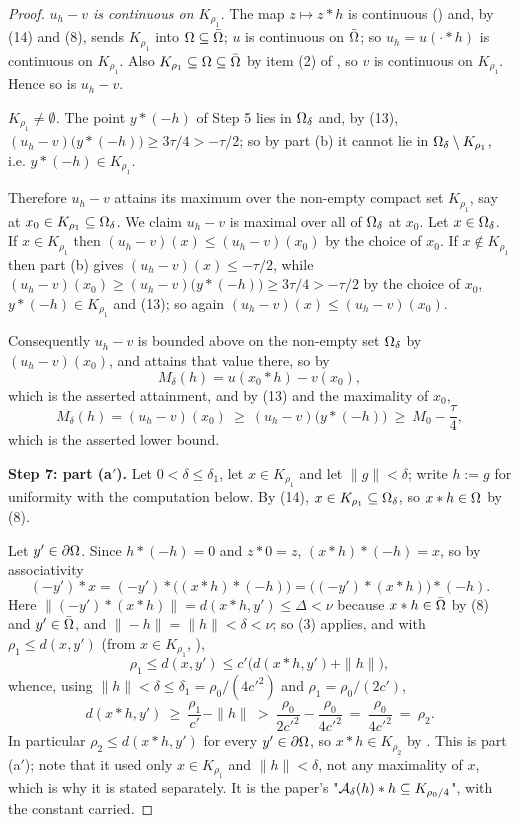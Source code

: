 \begin{proof}
\emph{$u_h-v$ is continuous on $K_{\rho_1}$.} The map $z\mapsto z*h$ is continuous
() and, by (14) and (8), sends $K_{\rho_1}$ into $\Omega\subseteq\bar{\Omega}$;
$u$ is continuous on $\bar{\Omega}$; so $u_h=u(\cdot*h)$ is continuous on $K_{\rho_1}$. Also
$K_{\rho_1}\subseteq\Omega\subseteq\bar{\Omega}$ by item (2) of , so
$v$ is continuous on $K_{\rho_1}$. Hence so is $u_h-v$.

\emph{$K_{\rho_1}\ne\emptyset$.} The point $y*(-h)$ of Step 5 lies in $\Omega_\delta$ and, by
(13), $(u_h-v)\big(y*(-h)\big)\ge3\tau/4>-\tau/2$; so by part (b) it cannot lie in
$\Omega_\delta\setminus K_{\rho_1}$, i.e. $y*(-h)\in K_{\rho_1}$.

Therefore $u_h-v$ attains its maximum over the non-empty compact set $K_{\rho_1}$, say at
$x_0\in K_{\rho_1}\subseteq\Omega_\delta$. We claim $u_h-v$ is maximal over all of $\Omega_\delta$
at $x_0$. Let $x\in\Omega_\delta$. If $x\in K_{\rho_1}$ then $(u_h-v)(x)\le(u_h-v)(x_0)$ by the
choice of $x_0$. If $x\notin K_{\rho_1}$ then part (b) gives $(u_h-v)(x)\le-\tau/2$, while
$(u_h-v)(x_0)\ge(u_h-v)\big(y*(-h)\big)\ge3\tau/4>-\tau/2$ by the choice of $x_0$,
$y*(-h)\in K_{\rho_1}$ and (13); so again $(u_h-v)(x)\le(u_h-v)(x_0)$.

Consequently $u_h-v$ is bounded above on the non-empty set $\Omega_\delta$ by
$(u_h-v)(x_0)$, and attains that value there, so by 
\[
 M_\delta(h)=u(x_0*h)-v(x_0) , \tag{15}
\]
which is the asserted attainment, and by (13) and the maximality of $x_0$,
\[
 M_\delta(h)=(u_h-v)(x_0)\ \ge\ (u_h-v)\big(y*(-h)\big)\ \ge\ M_0-\frac\tau4 ,
\]
which is the asserted lower bound.

\medskip\noindent\textbf{Step 7: part (a$'$).} Let $0<\delta\le\delta_1$, let
$x\in K_{\rho_1}$ and let $\|g\|<\delta$; write $h:=g$ for uniformity with the computation
below. By (14), $x\in K_{\rho_1}\subseteq\Omega_\delta$, so $x*h\in\Omega$ by (8).

Let $y'\in\partial\Omega$. Since $h*(-h)=0$ and
$z*0=z$, $(x*h)*(-h)=x$, so by associativity
\[
 (-y')*x=(-y')*\big((x*h)*(-h)\big)=\Big((-y')*(x*h)\Big)*(-h).
\]
Here $\|(-y')*(x*h)\|=d(x*h,y')\le\Delta<\nu$ because $x*h\in\bar{\Omega}$ by (8) and
$y'\in\bar{\Omega}$, and $\|-h\|=\|h\|<\delta<\nu$; so (3) applies, and with
$\rho_1\le d(x,y')$ (from $x\in K_{\rho_1}$, ),
\[
 \rho_1\le d(x,y')\le c'\Big(d(x*h,y')+\|h\|\Big),
\]
whence, using $\|h\|<\delta\le\delta_1=\rho_0/(4c'^{2})$ and $\rho_1=\rho_0/(2c')$,
\[
 d(x*h,y')\ \ge\ \frac{\rho_1}{c'}-\|h\|\ >\ \frac{\rho_0}{2c'^{2}}-\frac{\rho_0}{4c'^{2}}
 \ =\ \frac{\rho_0}{4c'^{2}}\ =\ \rho_2 .
\]
In particular $\rho_2\le d(x*h,y')$ for every $y'\in\partial\Omega$, so $x*h\in K_{\rho_2}$ by
. This is part (a$'$); note that it used only $x\in K_{\rho_1}$ and
$\|h\|<\delta$, not any maximality of $x$, which is why it is stated separately. It is the
paper's "$\mathcal{A}_\delta(h)*h\subseteq K_{\rho_0/4}$", with the constant carried.


\end{proof}
